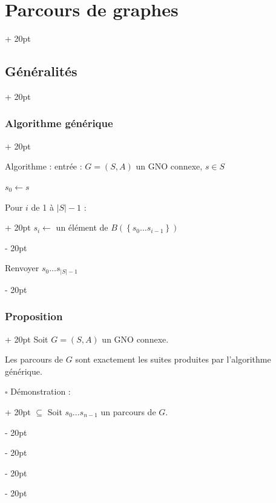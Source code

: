 \documentclass[a4paper, 12pt, twoside]{article}
\newcommand{\set}[1]{\left\{ #1 \right\}}
\newcommand{\abs}[1]{\left\lvert #1 \right\rvert}
\newcommand{\ind}[1][20pt]{\advance\leftskip + #1}
\newcommand{\deind}[1][20pt]{\advance\leftskip - #1}
\newenvironment{indt}[2][20pt]{#2 \par \ind[#1]}{\par \deind} %
\begin{document}
\begin{indt}{\section{Parcours de graphes}}
\begin{indt}{\subsection{Généralités}}
\begin{indt}{\subsubsection{Algorithme générique}}
\begin{center}
                \end{center}

                Algorithme : entrée : $G = (S, A)$ un GNO connexe, $s \in S$

                \begin{pseudocode}
                    $s_0 \leftarrow s$

                    \begin{indt}{Pour $i$ de 1 à $\abs S - 1$ :}
                        $s_i \leftarrow$ un élément de $B(\set{s_0 \ldots s_{i - 1}})$
                    \end{indt}
                    
                    \vspace{6pt}

                    Renvoyer $s_0 \ldots s_{\abs S - 1}$
                \end{pseudocode}
            \end{indt}

            \vspace{12pt}
            
            \begin{indt}{\subsubsection{Proposition}}
                Soit $G = (S, A)$ un GNO connexe.

                Les parcours de $G$ sont exactement les suites produites par l'algorithme générique.

                \vspace{6pt}
                
                \begin{indt}{$\square$ Démonstration :}
                    $\boxed \subseteq$ Soit $s_0 \ldots s_{n - 1}$ un parcours de $G$.


\end{indt}
\end{indt}
\end{indt}
\end{indt}
\end{document}
